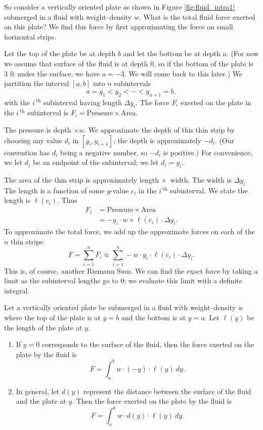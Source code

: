 So consider a vertically oriented plate as shown in Figure \ref{fig:fluid_intro1} submerged in a fluid with weight--density $w$. What is the total fluid force exerted on this plate? We find this force by first approximating the force on small horizontal strips.

Let the top of the plate be at depth $b$ and let the bottom be at depth $a$. (For now we assume that surface of the fluid is at depth 0, so if the bottom of the plate is 3 ft under the surface, we have $a=-3$. We will come back to this later.) We partition the interval $[a,b]$ into $n$ subintervals 
$$ a = y_1 < y_2 < \cdots <y_{n+1} = b, $$ with the $i\,^\text{th}$ subinterval having length $\Delta y_i$. The force $F_i$ exerted on the plate in the $i\,^\text{th}$ subinterval is $F_i = \text{Pressure}\times \text{Area}.$

The pressure is depth $\times w$. We approximate the depth of this thin strip by choosing any value $d_i$ in $[y_i,y_{i+1}]$; the depth is approximately $-d_i$. (Our convention has $d_i$ being a negative number, so $-d_i$ is positive.) For convenience, we let $d_i$ be an endpoint of the subinterval; we let $d_i = y_i$. 

The area of the thin strip is approximately length $\times$\ width. The width is $\Delta y_i$. The length is a function of some $y$-value $c_i$ in the $i\,^\text{th}$ subinterval. We state the length is $\ell(c_i)$. Thus 
\begin{align*}
F_i	&= \text{Pressure} \times \text{Area} \\
		&=	-y_i\cdot w \times \ell(c_i)\cdot\Delta y_i.
\end{align*}
To approximate the total force, we add up the approximate forces on each of the $n$ thin strips:
$$F = \sum_{i=1}^n F_i \approx \sum_{i=1}^n -w\cdot y_i\cdot\ell(c_i)\cdot\Delta y_i.$$ This is, of course, another Riemann Sum. We can find the exact force by taking a limit as the subinterval lengths go to 0; we evaluate this limit with a definite integral.

{Let a vertically oriented plate be submerged in a fluid with weight--density $w$ where the top of the plate is at $y=b$ and the bottom is at $y=a$. Let $\ell(y)$ be the length of the plate at $y$.
	\begin{enumerate}
	\item		If $y=0$ corresponds to the surface of the fluid, then the force exerted on the plate by the fluid is $$F=\int_a^b w\cdot(-y)\cdot\ell(y)\ dy.$$
	\item		In general, let $d(y)$ represent the distance between the surface of the fluid and the plate at $y$. Then the force exerted on the plate by the fluid is 
	$$F=\int_a^b w\cdot d(y)\cdot\ell(y)\ dy.$$
	\end{enumerate}
}

